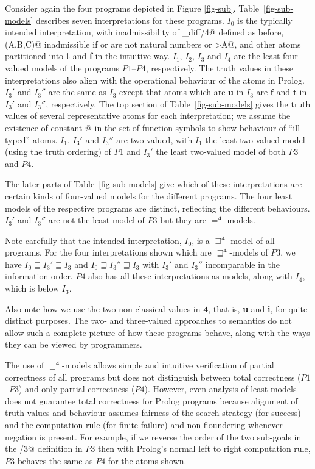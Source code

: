 \documentclass{tlp}
\newcommand{\Quad}{\ensuremath{\mathbf{4}}}
\begin{document}
\vspace{3ex}
\noindent
Consider again the four programs depicted in Figure \ref{fig-sub}.
Table~\ref{fig-sub-models} describes seven interpretations for these
programs.  $I_0$ is the typically intended interpretation, 
with inadmissibility of \verb@eq_diff/4@ defined as before, 
\verb@sub(A,B,C)@ inadmissible
if \verb@A@ or \verb@B@ are not natural numbers or \verb@B>A@, and other
atoms partitioned into \textbf{t} and \textbf{f} in the intuitive way.
$I_1$, $I_2$, $I_3$ and $I_4$ are the least four-valued models of the programs
$P1$--$P4$, respectively.  The truth values in these interpretations also
align with the operational behaviour of the atoms in Prolog. $I_3'$ and
$I_3''$ are the same as $I_3$ except that atoms which are $\mathbf{u}$ in
$I_3$ are $\mathbf{f}$ and $\mathbf{t}$ in $I_3'$ and $I_3''$, respectively.
The top section of Table~\ref{fig-sub-models} gives the truth values
of several representative atoms for each interpretation; we assume the
existence of constant \verb@[]@ in the set of function symbols to show
behaviour of ``ill-typed'' atoms.  $I_1$, $I_3'$ and $I_3''$ are two-valued,
with $I_1$ the least two-valued model (using the truth ordering) of $P1$
and $I_3'$ the least two-valued model of both $P3$ and $P4$.

The later parts of Table~\ref{fig-sub-models} give which of these
interpretations are certain kinds of four-valued models for the different
programs.  The four least models of the respective programs are distinct,
reflecting the different behaviours.  $I_3'$ and $I_3''$ are not the least
model of $P3$ but they are $=^\Quad$-models.  

Note carefully that the intended interpretation,
$I_0$, is a $\sqsupseteq^\Quad$-model of all programs.  
For the four
interpretations shown which are $\sqsupseteq^\Quad$-models of $P3$,
we have $I_0 \sqsupseteq I_3' \sqsupseteq I_3$ and $I_0 \sqsupseteq I_3''
\sqsupseteq I_3$ with $I_3'$ and $I_3''$ incomparable in the information
order.  $P4$ also has all these interpretations as models, along with
$I_4$, which is below $I_3$.  

Also note how we use the two non-classical values
in $\Quad$, that is, \textbf{u} and \textbf{i}, 
for quite distinct purposes.
The two- and three-valued approaches to semantics do not allow such a
complete picture of how these programs behave, along with the ways they
can be viewed by programmers.

The use of $\sqsupseteq^\Quad$-models
allows simple and intuitive verification of partial correctness of
all programs but does not distinguish between total correctness ($P1$--$P3$)
and only partial correctness ($P4$).  However, even analysis of least
models does not guarantee total correctness for Prolog programs because
alignment of truth values and behaviour assumes fairness of the search
strategy (for success) and the computation rule (for finite failure)
and non-floundering whenever negation is present.  For example, if we
reverse the order of the two sub-goals in the \verb@sub/3@ definition
in $P3$ then with Prolog's normal left to right computation rule, $P3$
behaves the same as $P4$ for the atoms shown.
\end{document}
